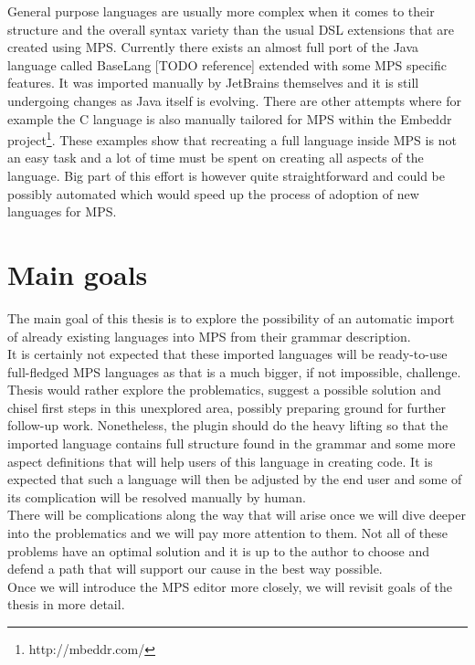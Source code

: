 General purpose languages are usually more complex when it comes to their structure and the overall syntax variety than the usual DSL extensions that are created using MPS. Currently there exists an almost full port of the Java language called BaseLang [TODO reference] extended with some MPS specific features. It was imported manually by JetBrains themselves and it is still undergoing changes as Java itself is evolving. There are other attempts where for example the C language is also manually tailored for MPS within the Embeddr project\footnote{http://mbeddr.com/}. These examples show that recreating a full language inside MPS is not an easy task and a lot of time must be spent on creating all aspects of the language. Big part of this effort is however quite straightforward and could be possibly automated which would speed up the process of adoption of new languages for MPS.

\section{Main goals}

The main goal of this thesis is to explore the possibility of an automatic import of already existing languages into MPS from their grammar description. 
\\

It is certainly not expected that these imported languages will be ready-to-use full-fledged MPS languages as that is a much bigger, if not impossible, challenge. Thesis would rather explore the problematics, suggest a possible solution and chisel first steps in this unexplored area, possibly preparing ground for further follow-up work. Nonetheless, the plugin should do the heavy lifting so that the imported language contains full structure found in the grammar and some more aspect definitions that will help users of this language in creating code. It is expected that such a language will then be adjusted by the end user and some of its complication will be resolved manually by human.
\\

There will be complications along the way that will arise once we will dive deeper into the problematics and we will pay more attention to them. Not all of these problems have an optimal solution and it is up to the author to choose and defend a path that will support our cause in the best way possible.
\\

Once we will introduce the MPS editor more closely, we will revisit goals of the thesis in more detail.

